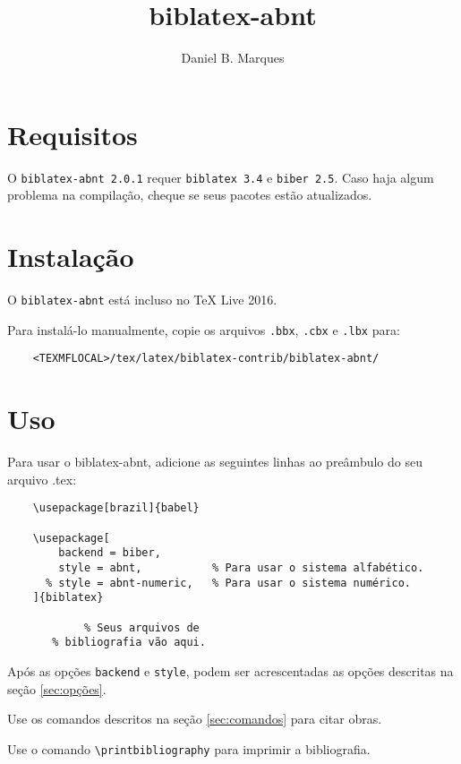 \documentclass[a4paper]{article}
\title{biblatex-abnt \version}
\author{Daniel B. Marques}
\newcommand{\version}{2.0.1}
\newcommand{\requirements}{\texttt{biblatex 3.4} e \texttt{biber 2.5}}
\begin{document}
\maketitle

\tableofcontents

\clearpage
\section{Requisitos}

O \texttt{biblatex-abnt \version} requer \requirements. Caso haja algum problema na compilação, cheque se seus pacotes estão atualizados.

\section{Instalação}

O \texttt{biblatex-abnt} está incluso no TeX Live 2016.

Para instalá-lo manualmente, copie os arquivos \texttt{.bbx}, \texttt{.cbx} e \texttt{.lbx} para:
\begin{verbatim}
    <TEXMFLOCAL>/tex/latex/biblatex-contrib/biblatex-abnt/
\end{verbatim}

\section{Uso}

Para usar o {biblatex-abnt}, adicione as seguintes linhas ao preâmbulo do seu arquivo {.tex}:

\begin{verbatim}
    \usepackage[brazil]{babel}

    \usepackage[
        backend = biber,
        style = abnt,           % Para usar o sistema alfabético.
      % style = abnt-numeric,   % Para usar o sistema numérico.
    ]{biblatex}

            % Seus arquivos de
       % bibliografia vão aqui.
\end{verbatim}

Após as opções \texttt{backend} e \texttt{style}, podem ser acrescentadas as opções descritas na seção \ref{sec:opções}.

Use os comandos descritos na seção \ref{sec:comandos} para citar obras.

Use o comando \verb"\printbibliography" para imprimir a bibliografia.
\end{document}
